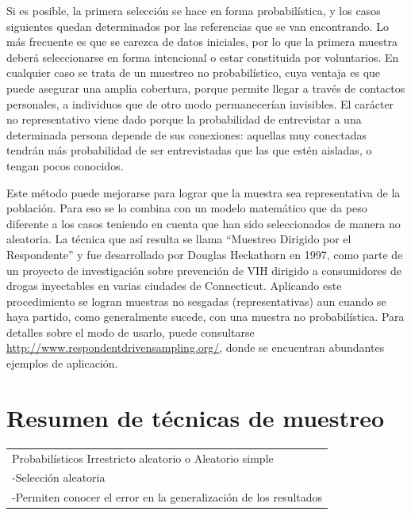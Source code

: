 \documentclass[]{book}
\begin{document}
Si es posible, la primera selección se hace en forma probabilística, y
los casos siguientes quedan determinados por las referencias que se van
encontrando. Lo más frecuente es que se carezca de datos iniciales, por
lo que la primera muestra deberá seleccionarse en forma intencional o
estar constituida por voluntarios. En cualquier caso se trata de un
muestreo no probabilístico, cuya ventaja es que puede asegurar una
amplia cobertura, porque permite llegar a través de contactos
personales, a individuos que de otro modo permanecerían invisibles. El
carácter no representativo viene dado porque la probabilidad de
entrevistar a una determinada persona depende de sus conexiones:
aquellas muy conectadas tendrán más probabilidad de ser entrevistadas
que las que estén aisladas, o tengan pocos conocidos.

Este método puede mejorarse para lograr que la muestra sea
representativa de la población. Para eso se lo combina con un modelo
matemático que da peso diferente a los casos teniendo en cuenta que han
sido seleccionados de manera no aleatoria. La técnica que así resulta se
llama ``Muestreo Dirigido por el Respondente'' y fue desarrollado por
Douglas Heckathorn en 1997, como parte de un proyecto de investigación
sobre prevención de VIH dirigido a consumidores de drogas inyectables en
varias ciudades de Connecticut. Aplicando este procedimiento se logran
muestras no sesgadas (representativas) aun cuando se haya partido, como
generalmente sucede, con una muestra no probabilística. Para detalles
sobre el modo de usarlo, puede consultarse
\url{http://www.respondentdrivensampling.org/}, donde se encuentran abundantes
ejemplos de aplicación.

\hypertarget{resumen-de-tecnicas-de-muestreo}{%
\section{Resumen de técnicas de muestreo}\label{resumen-de-tecnicas-de-muestreo}}

\begin{longtable}[]{@{}l@{}}
\toprule
\endhead
\begin{minipage}[t]{0.96\columnwidth}\raggedright
Probabilísticos Irrestricto aleatorio o Aleatorio simple\strut
\end{minipage}\tabularnewline
\begin{minipage}[t]{0.96\columnwidth}\raggedright
-Selección aleatoria\strut
\end{minipage}\tabularnewline
\begin{minipage}[t]{0.96\columnwidth}\raggedright
-Permiten conocer el error en la generalización de los resultados\strut
\end{minipage}\tabularnewline
\bottomrule
\end{longtable}
\end{document}
